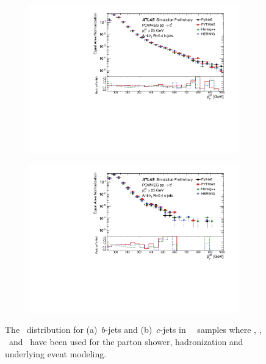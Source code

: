 \begin{figure}
\centering
\begin{subfigure}[]{0.45\textwidth}
\includegraphics[width=\textwidth]{evtgen/figures/Frag/Top/SingleB/h_JetpT.pdf}
\end{subfigure}
\begin{subfigure}[]{0.45\textwidth}
\includegraphics[width=\textwidth]{evtgen/figures/Frag/Top/SingleC/h_JetpT.pdf}
\end{subfigure}
\caption{The \ptJet\ distribution for 
(a)~$b$-jets and (b)~$c$-jets in \PowHeg\
\ttbar\ samples where  \PythiaE, \Pythia, \Herwigpp\ and \Herwig\ have been used 
for the parton shower, hadronization and underlying event modeling.}
\label{fig:tjpt}
\end{figure}


